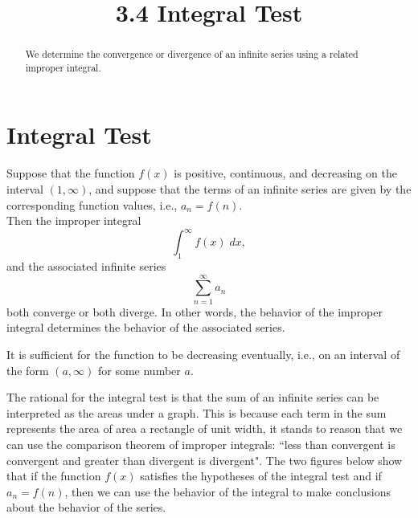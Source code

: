 \documentclass[handout]{ximera}
\title{3.4 Integral Test}
\begin{document}
\begin{abstract}
We determine the convergence or divergence of an infinite series using a related improper integral.
\end{abstract}

\maketitle

\section{Integral Test}

\begin{theorem}
Suppose that the function $f(x)$ is positive, continuous, and decreasing on the interval $(1, \infty)$, and 
suppose that the terms of an infinite series
are given by the corresponding function values, i.e., $a_n = f(n)$. \\
Then the improper integral
\[
\int_1^\infty f(x) \; dx,
\]
and the associated infinite series
\[
\sum_{n=1}^\infty a_n
\]
both converge or both diverge. In other words, the behavior of the improper integral 
determines the behavior of the associated series.
\end{theorem}

\begin{remark}
It is sufficient for the function to be decreasing eventually, i.e., on an interval of the form $(a, \infty)$
for some number $a$.
\end{remark}

The rational for the integral test is that the sum of an infinite series can be interpreted as the areas under a graph.
This is because each term in the sum represents the area of area a rectangle of unit width, 
it stands to reason that we can use the comparison theorem of improper integrals: ``less than convergent is convergent and greater 
than divergent is divergent". The two figures below show that if 
the function $f(x)$ satisfies the hypotheses of the integral test and if  $a_n = f(n)$, then we can use the behavior of the integral to make conclusions about the behavior of the series.
\end{document}
